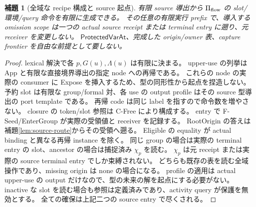 \documentclass[11pt,a4paper]{article}
\newtheorem{lemma}[definition]{補題}
\begin{document}
\begin{lemma}[全域な recipe 構成と source 起点]
\label{lem:flow-formation}
有限 source 導出から \(\Pi_{\rm flow}\) の slot/環境/query 命令を有限に生成できる。
その任意の有限実行 prefix で、導入する omission scope は一つの actual source receipt または
terminal entry に遡り、元 receiver を変更しない。
\(\mathsf{ProtectedVarAt}\)、完成した origin/owner 表、capture frontier を自由な前提として要しない。
\end{lemma}
\begin{proof}
lexical 解決で各 \(p,G(u),\Lambda(u)\) は有限に決まる。
upper-use の列挙は App と有限な直接境界導出の指定 node への再帰である。
これらの node の実際の consumer に Expose を挿入するため、型の同形性から起点を捏造しない。
予約 slot は有限な group/formal 対、各 use の output profile はその source 型導出の port template である。
再帰 code は同じ label を指すので命令数を増やさない。
closure の token/slot 参照は C-Free により構成する。
entry で F-Seed/EnterGroup が実際の受領値と receiver を記録する。
RootOrigin の答えは補題\ref{lem:source-route}からその受領へ遡る。
Eligible の equality が actual binding と異なる再帰 instance を除く。
同じ group の場合は実際の terminal entry の slot、ancestor の場合は捕捉済み \(\chi_p\) を読む。
\(\chi_p\) は元 receipt または実際の source terminal entry でしか束縛されない。
どちらも既存の表を読む全域操作であり、missing origin は none の場合になる。
profile の適用は actual upper-use の output だけなので、型の未来の解を起点にする必要がない。
inactive な slot を読む場合も参照は定義済みであり、activity query が保護を無効とする。
全ての確保は上記二つの source entry で尽くされる。
\end{proof}
\end{document}
